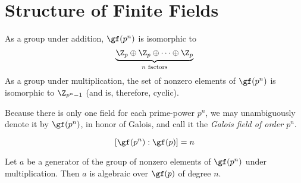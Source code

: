\section{Structure of Finite Fields}

\begin{theorem}
	As a group under addition, $\gf(p^n)$ is isomorphic to
	\[ \underbrace{\Z_p \oplus \Z_p \oplus \dots \oplus \Z_p}_\text{$n$ factors} \]
	As a group under multiplication, the set of nonzero elements of $\gf(p^n)$ is isomorphic to $\Z_{p^n-1}$ (and is, therefore, cyclic).
\end{theorem}

\begin{remark}
	Because there is only one field for each prime-power $p^n$, we may unambiguously denote it by $\gf(p^n)$, in honor of Galois, and call it the \textit{Galois field of order $p^n$}.
\end{remark}

\begin{corollary}
	\[ [\gf(p^n):\gf(p)]=n \]
\end{corollary}

\begin{corollary}
	Let $a$ be a generator of the group of nonzero elements of $\gf(p^n)$ under multiplication. Then $a$ is algebraic over $\gf(p)$ of degree $n$.
\end{corollary}
